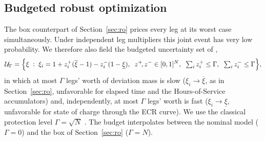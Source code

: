 \documentclass[preprint,12pt,3p]{elsarticle}
\begin{document}
\subsection{Budgeted robust optimization} \label{sec:robu}
The box counterpart of Section~\ref{sec:ro} prices every leg at its worst case simultaneously. Under independent leg multipliers this joint event has very low probability. We therefore also field the budgeted uncertainty set of \citet{bertsimas_price_2004},
\[
  \mathcal U_\Gamma = \Bigl\{ \xi \;:\; \xi_i = 1 + z_i^{+}(\overline\xi - 1) - z_i^{-}(1-\underline\xi),
  \;\; z^{+}\!, z^{-} \in [0,1]^N,
  \;\; \textstyle\sum_i z_i^{+} \le \Gamma,
  \;\; \sum_i z_i^{-} \le \Gamma \Bigr\},
\]
in which at most $\Gamma$ legs' worth of deviation mass is slow ($\xi_i \to \overline\xi$, as in Section~\ref{sec:ro}, unfavorable for elapsed time and the Hours-of-Service accumulators) and, independently, at most $\Gamma$ legs' worth is fast ($\xi_i \to \underline\xi$, unfavorable for state of charge through the ECR curve).
We use the classical protection level $\Gamma = \sqrt{N} $ \citep{bertsimas_price_2004}. The budget interpolates between the nominal model ($\Gamma = 0$) and the box of Section~\ref{sec:ro} ($\Gamma = N$).
\end{document}
